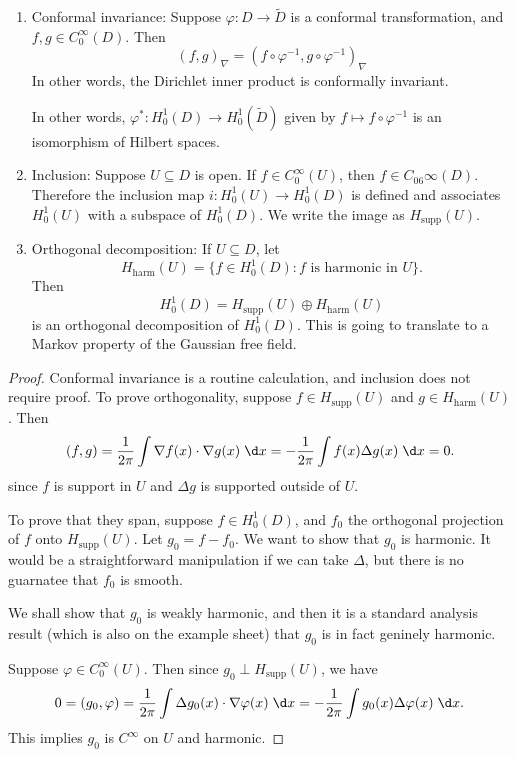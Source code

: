 \documentclass[a4paper]{article}
\begin{document}
\begin{prop}\leavevmode
  \begin{enumerate}
    \item Conformal invariance: Suppose $\varphi: D \to \tilde{D}$ is a conformal transformation, and $f, g \in C_0^\infty(D)$. Then
      \[
        (f, g)_\nabla = (f \circ \varphi^{-1}, g \circ \varphi^{-1})_\nabla
      \]
      In other words, the Dirichlet inner product is conformally invariant.

      In other words, $\varphi^*: H_0^1(D) \to H_0^1(\tilde{D})$ given by $f \mapsto f \circ \varphi^{-1}$ is an isomorphism of Hilbert spaces.
    \item Inclusion: Suppose $U \subseteq D$ is open. If $f \in C_0^\infty(U)$, then $f \in C_06\infty(D)$. Therefore the inclusion map $i: H_0^1(U) \to H_0^1(D)$ is defined and associates $H_0^1(U)$ with a subspace of $H_0^1(D)$. We write the image as $H_{\mathrm{supp}}(U)$.
    \item Orthogonal decomposition: If $U \subseteq D$, let
      \[
        H_{\mathrm{harm}}(U) = \{f \in H_0^1(D): f\text{ is harmonic in }U\}.
      \]
      Then
      \[
        H_0^1(D) = H_{\mathrm{supp}}(U) \oplus H_{\mathrm{harm}}(U)
      \]
      is an orthogonal decomposition of $H_0^1(D)$. This is going to translate to a Markov property of the Gaussian free field.
  \end{enumerate}
\end{prop}

\begin{proof}
  Conformal invariance is a routine calculation, and inclusion does not require proof. To prove orthogonality, suppose $f \in H_{\mathrm{supp}}(U)$ and $g \in H_{\mathrm{harm}}(U)$. Then
  \[
    (f, g) = \frac{1}{2\pi} \int \nabla f(x) \cdot \nabla g(x) \;\d x =- \frac{1}{2\pi} \int f(x) \Delta g(x)\;\d x = 0.
  \]
  since $f$ is support in $U$ and $\Delta g$ is supported outside of $U$.

  To prove that they span, suppose $f \in H_0^1(D)$, and $f_0$ the orthogonal projection of $f$ onto $H_{\mathrm{supp}}(U)$. Let $g_0 = f - f_0$. We want to show that $g_0$ is harmonic. It would be a straightforward manipulation if we can take $\Delta$, but there is no guarnatee that $f_0$ is smooth.

  We shall show that $g_0$ is weakly harmonic, and then it is a standard analysis result (which is also on the example sheet) that $g_0$ is in fact geninely harmonic.

  Suppose $\varphi \in C_0^\infty(U)$. Then since $g_0 \perp H_{\mathrm{supp}}(U)$, we have
  \[
    0 = (g_0, \varphi) = \frac{1}{2\pi} \int \Delta g_0(x) \cdot \nabla \varphi(x)\;\d x = - \frac{1}{2\pi} \int g_0(x) \Delta \varphi(x)\;\d x.
  \]
  This implies $g_0$ is $C^\infty$ on $U$ and harmonic.
\end{proof}
\end{document}
